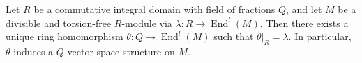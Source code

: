 Let $R$ be a commutative integral domain with field of fractions $Q$, and let $M$ be a divisible and torsion-free $R$-module via $\lambda: R \rightarrow \operatorname{End}^l(M)$. Then there exists a unique ring homomorphism $\theta: Q \rightarrow \operatorname{End}^l(M)$ such that $\theta|_R = \lambda$. In particular, $\theta$ induces a $Q$-vector space structure on $M$.
